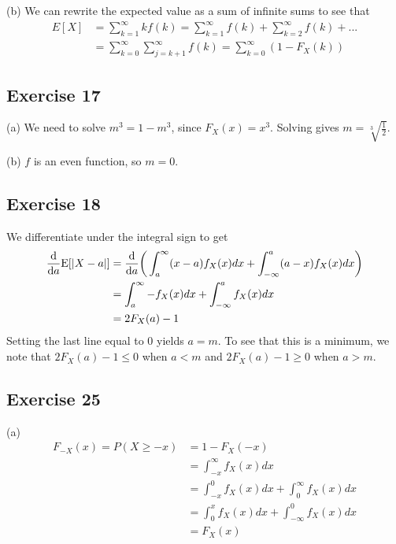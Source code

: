 (b) We can rewrite the expected value as a sum of infinite sums to see that
\begin{align*}
        E[X] &= \sum_{k = 1}^\infty k f(k) = \sum_{k = 1}^\infty f(k) + \sum_{k = 2}^\infty f(k) + ... \\
             &= \sum_{k = 0}^\infty \sum_{j = k + 1}^\infty f(k) = \sum_{k = 0}^\infty (1 - F_X(k))
\end{align*}

\subsection{Exercise 17}
(a) We need to solve $m^3 = 1 - m^3$, since $F_X(x) = x^3$. Solving gives $m = \sqrt[3]{\frac{1}{2}}$.

(b) $f$ is an even function, so $m = 0$.

\subsection{Exercise 18}
We differentiate under the integral sign to get
\begin{align*}
        \dv{a} \mathrm{E} [\abs{X - a}] &= \dv{a} \bigg(\int_{a}^{\infty} (x - a) f_X(x) dx + \int_{-\infty}^{a} (a - x) f_X(x) dx\bigg) \\
                                        &= \int_{a}^{\infty} -f_X(x) dx + \int_{-\infty}^{a} f_X(x) dx \\  
                                        &= 2F_X(a) - 1
\end{align*}
Setting the last line equal to 0 yields $a = m$. To see that this is a minimum, we note that $2F_X(a) - 1 \leq 0$
when $a < m$ and $2F_X(a) - 1 \geq 0$ when $a > m$.

\subsection{Exercise 25}
(a)
\begin{align*}
        F_{-X}(x) = P(X \geq -x) &= 1 - F_X(-x) \\
                                 &= \int_{-x}^{\infty} f_X(x) dx \\
                                 &= \int_{-x}^{0} f_X(x) dx + \int_{0}^{\infty} f_X(x) dx \\
                                 &= \int_{0}^{x} f_X(x) dx + \int_{-\infty}^{0} f_X(x) dx \\  
                                 &= F_X(x)
\end{align*}

